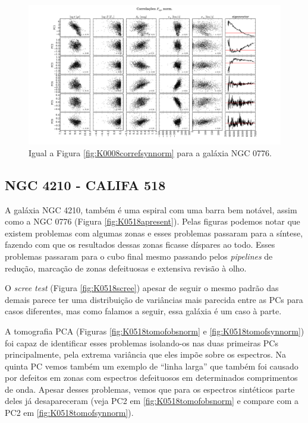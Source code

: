 \begin{figure}
    \includegraphics[width=1.3\textwidth, angle=-90]{figuras/K0073-correl-f_syn_norm-PCvsPhys.pdf}
	\caption[Correlações PCs vs. par\^ametros f\'isicos - $F_{syn}$ norm. - NGC 0001]
	{Igual a Figura \ref{fig:K0008correfsynnorm} para a galáxia NGC 0776.}
    \label{fig:K0073correfsynnorm}
\end{figure}

\subsection{NGC 4210 - CALIFA 518}

A galáxia NGC 4210, também é uma espiral com uma barra bem notável, assim como a NGC 0776 (Figura
\ref{fig:K0518apresent}). Pelas figuras podemos notar que existem problemas com algumas zonas e esses problemas passaram
para a síntese, fazendo com que os resultados dessas zonas ficasse díspares ao todo. Esses problemas passaram para o
cubo final mesmo passando pelos {\em pipelines} de redução, marcação de zonas defeituosas e extensiva revisão à olho.

O {\em scree test} (Figura \ref{fig:K0518scree}) apesar de seguir o mesmo padrão das demais parece ter uma distribuição
de variâncias mais parecida entre as PCs para casos diferentes, mas como falamos a seguir, essa galáxia é um caso à
parte.

A tomografia PCA (Figuras \ref{fig:K0518tomofobsnorm} e \ref{fig:K0518tomofsynnorm}) foi capaz de identificar esses
problemas isolando-os nas duas primeiras PCs principalmente, pela extrema variância que eles impõe sobre os espectros.
Na quinta PC vemos também um exemplo de ``linha larga'' que também foi causado por defeitos em zonas com espectros
defeituosos em determinados comprimentos de onda. Apesar desses problemas, vemos que para os espectros sintéticos
parte deles já desapareceram (veja PC2 em \ref{fig:K0518tomofobsnorm} e compare com a PC2 em
\ref{fig:K0518tomofsynnorm}). 

